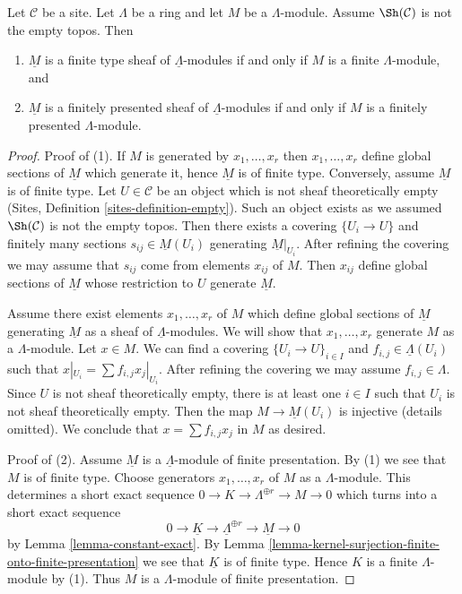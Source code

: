 \begin{lemma}
\label{lemma-locally-constant-finite-type}
Let $\mathcal{C}$ be a site. Let $\Lambda$ be a ring and let $M$ be a
$\Lambda$-module. Assume $\Sh(\mathcal{C})$ is not the empty topos. Then
\begin{enumerate}
\item $\underline{M}$ is a finite type sheaf of $\underline{\Lambda}$-modules
if and only if $M$ is a finite $\Lambda$-module, and
\item $\underline{M}$ is a finitely presented sheaf of
$\underline{\Lambda}$-modules if and only if $M$ is a 
finitely presented $\Lambda$-module.
\end{enumerate}
\end{lemma}

\begin{proof}
Proof of (1). If $M$ is generated by $x_1, \ldots, x_r$ then
$x_1, \ldots, x_r$ define global sections of $\underline{M}$ which
generate it, hence $\underline{M}$ is of finite type. Conversely, assume
$\underline{M}$ is of finite type. Let $U \in \mathcal{C}$ be an object
which is not sheaf theoretically empty
(Sites, Definition \ref{sites-definition-empty}).
Such an object exists as we assumed $\Sh(\mathcal{C})$ is not
the empty topos. Then there exists a covering $\{U_i \to U\}$
and finitely many sections $s_{ij} \in \underline{M}(U_i)$ generating
$\underline{M}|_{U_i}$. After refining the covering we may assume
that $s_{ij}$ come from elements $x_{ij}$ of $M$. Then
$x_{ij}$ define global sections of $\underline{M}$ whose restriction
to $U$ generate $\underline{M}$.

\medskip\noindent
Assume there exist elements $x_1, \ldots, x_r$ of $M$ which define
global sections of $\underline{M}$ generating $\underline{M}$
as a sheaf of $\underline{\Lambda}$-modules. We will show that
$x_1, \ldots, x_r$ generate $M$ as a $\Lambda$-module.
Let $x \in M$. We can find a covering $\{U_i \to U\}_{i \in I}$
and $f_{i, j} \in \underline{\Lambda}(U_i)$ such that
$x|_{U_i} = \sum f_{i, j} x_j|_{U_i}$. After refining the covering
we may assume $f_{i, j} \in \Lambda$. Since $U$ is not
sheaf theoretically empty, there is at least one $i \in I$
such that $U_i$ is not sheaf theoretically empty.
Then the map $M \to \underline{M}(U_i)$ is injective (details omitted).
We conclude that $x = \sum f_{i, j}x_j$ in $M$ as desired.

\medskip\noindent
Proof of (2). Assume $\underline{M}$ is a $\underline{\Lambda}$-module
of finite presentation. By (1) we see that $M$ is of finite type.
Choose generators $x_1, \ldots, x_r$ of $M$ as a $\Lambda$-module.
This determines a short exact sequence
$0 \to K \to \Lambda^{\oplus r} \to M \to 0$ which
turns into a short exact sequence
$$
0 \to \underline{K} \to \underline{\Lambda}^{\oplus r} \to \underline{M} \to 0
$$
by Lemma \ref{lemma-constant-exact}. By
Lemma \ref{lemma-kernel-surjection-finite-onto-finite-presentation}
we see that $\underline{K}$ is of finite type. Hence $K$ is a
finite $\Lambda$-module by (1). Thus $M$ is a $\Lambda$-module
of finite presentation.
\end{proof}




